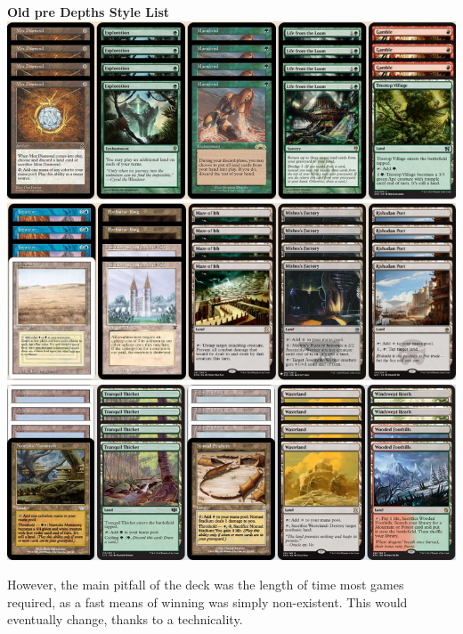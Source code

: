 \documentclass{report}
\begin{document}
\begin{center}
\textbf{Old pre Depths Style List}
\includegraphics[width=\textwidth]{blast1}
\includegraphics[width=\textwidth]{blast2}
\includegraphics[width=\textwidth]{blast3}
\end{center}
However, the main pitfall of the deck was the length of time most games required, as a fast means of winning was simply non-existent. 
This would eventually change, thanks to a technicality.\\
\newpage
\end{document}
